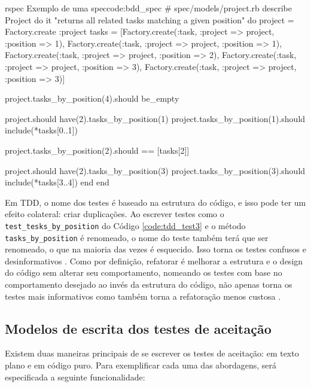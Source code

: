 \begin{mycode}{rspec}%
{Exemplo de uma spec}{code:bdd_spec}
# spec/models/project.rb
describe Project do
  it "returns all related tasks matching a given position" do
    project = Factory.create :project
    tasks = [Factory.create(:task, :project => project, :position => 1),
             Factory.create(:task, :project => project, :position => 1),
             Factory.create(:task, :project => project, :position => 2),
             Factory.create(:task, :project => project, :position => 3),
             Factory.create(:task, :project => project, :position => 3)]

    project.tasks_by_position(4).should be_empty

    project.should have(2).tasks_by_position(1)
    project.tasks_by_position(1).should include(*tasks[0..1])

    project.tasks_by_position(2).should == [tasks[2]]

    project.should have(2).tasks_by_position(3)
    project.tasks_by_position(3).should include(*tasks[3..4])
  end
end
\end{mycode}

Em TDD, o nome dos testes é baseado na estrutura do código, e isso pode ter um efeito colateral: criar duplicações. Ao escrever testes como o \texttt{test\_tesks\_by\_position} do Código \ref{code:tdd_test3} e o método \texttt{tasks\_by\_position} é renomeado, o nome do teste também terá que ser renomeado, o que na maioria das vezes é esquecido. Isso torna os testes confusos e desinformativos \cite{ContinuousTesting}. Como por definição, refatorar é melhorar a estrutura e o design do código sem alterar seu comportamento, nomeando os testes com base no comportamento desejado ao invés da estrutura do código, não apenas torna os testes mais informativos como também torna a refatoração menos custosa \cite{ContinuousTesting}.



\subsection{Modelos de escrita dos testes de aceitação}
\label{sub:modelos_de_escrita_dos_testes_de_aceitacao}

Existem duas maneiras principais de se escrever os testes de aceitação: em texto plano e em código puro. Para exemplificar cada uma das abordagens, será especificada a seguinte funcionalidade:

